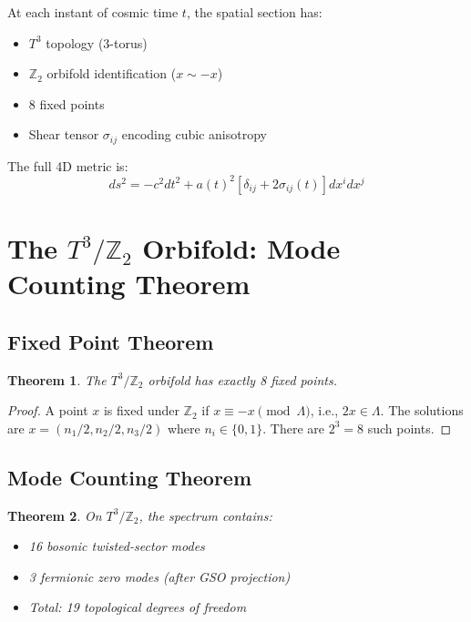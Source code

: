 \documentclass[12pt,a4paper]{article}
\newtheorem{theorem}{Theorem}[section]
\newcommand{\Ztwo}{\mathbb{Z}_2}
\newcommand{\Tthree}{T^3}
\begin{document}
At each instant of cosmic time $t$, the spatial section has:
\begin{itemize}
    \item $\Tthree$ topology (3-torus)
    \item $\Ztwo$ orbifold identification ($x \sim -x$)
    \item 8 fixed points
    \item Shear tensor $\sigma_{ij}$ encoding cubic anisotropy
\end{itemize}

The full 4D metric is:
\begin{equation}
\boxed{ds^2 = -c^2 dt^2 + a(t)^2 \left[ \delta_{ij} + 2\sigma_{ij}(t) \right] dx^i dx^j}
\end{equation}

\section{The $\Tthree/\Ztwo$ Orbifold: Mode Counting Theorem}
\label{sec:orbifold}

\subsection{Fixed Point Theorem}

\begin{theorem}
The $\Tthree/\Ztwo$ orbifold has exactly 8 fixed points.
\end{theorem}

\begin{proof}
A point $x$ is fixed under $\Ztwo$ if $x \equiv -x \pmod{\Lambda}$, i.e., $2x \in \Lambda$. The solutions are $x = (n_1/2, n_2/2, n_3/2)$ where $n_i \in \{0,1\}$. There are $2^3 = 8$ such points.
\end{proof}

\subsection{Mode Counting Theorem}

\begin{theorem}
On $\Tthree/\Ztwo$, the spectrum contains:
\begin{itemize}
    \item 16 bosonic twisted-sector modes
    \item 3 fermionic zero modes (after GSO projection)
    \item Total: 19 topological degrees of freedom
\end{itemize}
\end{theorem}
\end{document}
